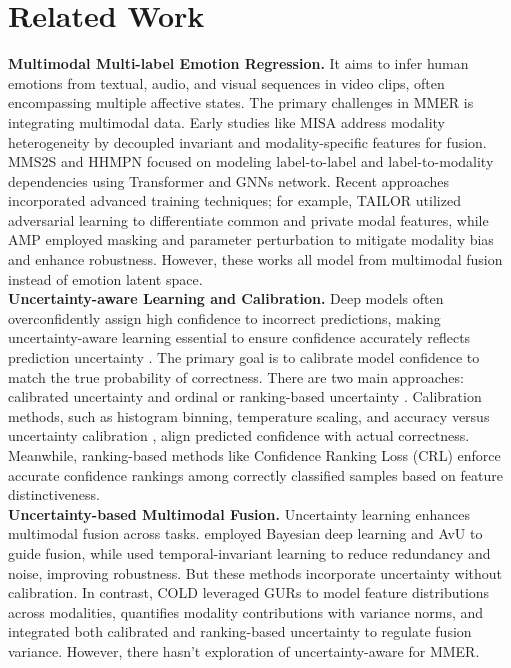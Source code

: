 \section{Related Work}
\textbf{Multimodal Multi-label Emotion Regression.} It aims to infer human emotions from textual, audio, and visual sequences in video clips, often encompassing multiple affective states. The primary challenges in MMER is integrating multimodal data. Early studies like MISA \citep{b23} address modality heterogeneity by decoupled invariant and modality-specific features for fusion. MMS2S \citep{b9} and HHMPN \citep{b3} focused on modeling label-to-label and label-to-modality dependencies using Transformer and GNNs network. Recent approaches \citep{b5, b6, b7} incorporated advanced training techniques; for example, TAILOR \citep{b7} utilized adversarial learning to differentiate common and private modal features, while AMP \citep{b24} employed masking and parameter perturbation to mitigate modality bias and enhance robustness. However, these works all model from multimodal fusion instead of emotion latent space. \\
\textbf{Uncertainty-aware Learning and Calibration.} Deep models often overconfidently assign high confidence to incorrect predictions, making uncertainty-aware learning essential to ensure confidence accurately reflects prediction uncertainty \citep{b28}. The primary goal is to calibrate model confidence to match the true probability of correctness. There are two main approaches: calibrated uncertainty \citep{b28} and ordinal or ranking-based uncertainty \citep{b29}. Calibration methods, such as histogram binning, temperature scaling, and accuracy versus uncertainty calibration \citep{b30,b28,b31}, align predicted confidence with actual correctness. Meanwhile, ranking-based methods like Confidence Ranking Loss (CRL) \citep{b29} enforce accurate confidence rankings among correctly classified samples based on feature distinctiveness.\\
\textbf{Uncertainty-based Multimodal Fusion.} Uncertainty learning enhances multimodal fusion across tasks. \citet{b27} employed Bayesian deep learning and AvU to guide fusion, while \citet{b26} used temporal-invariant learning to reduce redundancy and noise, improving robustness. But these methods incorporate uncertainty without calibration. In contrast, COLD \citep{b25} leveraged GURs to model feature distributions across modalities, quantifies modality contributions with variance norms, and integrated both calibrated and ranking-based uncertainty to regulate fusion variance. However, there hasn't exploration of uncertainty-aware for MMER.